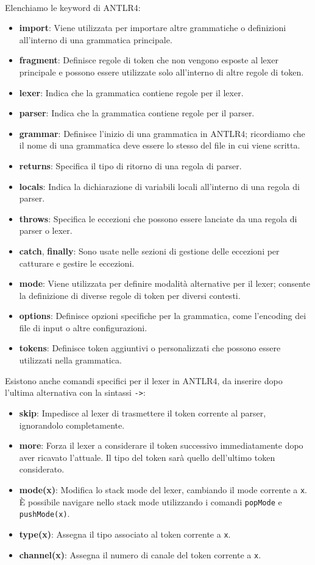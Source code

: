 \documentclass{article}
\begin{document}
\\
Elenchiamo le keyword di ANTLR4:
\begin{itemize}
    \item \textbf{import}: Viene utilizzata per importare altre grammatiche o definizioni all'interno di una grammatica principale.
    \item \textbf{fragment}: Definisce regole di token che non vengono esposte al lexer principale e possono essere utilizzate solo all'interno di altre regole di token.
    \item \textbf{lexer}: Indica che la grammatica contiene regole per il lexer.
    \item \textbf{parser}: Indica che la grammatica contiene regole per il parser.
    \item \textbf{grammar}: Definisce l'inizio di una grammatica in ANTLR4; ricordiamo che il nome di una grammatica deve essere lo stesso del file in cui viene scritta.
    \item \textbf{returns}: Specifica il tipo di ritorno di una regola di parser.
    \item \textbf{locals}: Indica la dichiarazione di variabili locali all'interno di una regola di parser.
    \item \textbf{throws}: Specifica le eccezioni che possono essere lanciate da una regola di parser o lexer.
    \item \textbf{catch}, \textbf{finally}: Sono usate nelle sezioni di gestione delle eccezioni per catturare e gestire le eccezioni.
    \item \textbf{mode}: Viene utilizzata per definire modalità alternative per il lexer; consente la definizione di diverse regole di token per diversi contesti.
    \item \textbf{options}: Definisce opzioni specifiche per la grammatica, come l'encoding dei file di input o altre configurazioni.
    \item \textbf{tokens}: Definisce token aggiuntivi o personalizzati che possono essere utilizzati nella grammatica.
\end{itemize}
Esistono anche comandi specifici per il lexer in ANTLR4, da inserire dopo l'ultima alternativa con la sintassi \texttt{->}:

\begin{itemize}
    \item \textbf{skip}: Impedisce al lexer di trasmettere il token corrente al parser, ignorandolo completamente.
    \item \textbf{more}: Forza il lexer a considerare il token successivo immediatamente dopo aver ricavato l'attuale. Il tipo del token sarà quello dell'ultimo token considerato.
    \item \textbf{mode(x)}: Modifica lo stack mode del lexer, cambiando il mode corrente a \texttt{x}. È possibile navigare nello stack mode utilizzando i comandi \texttt{popMode} e \texttt{pushMode(x)}.
    \item \textbf{type(x)}: Assegna il tipo associato al token corrente a \texttt{x}.
    \item \textbf{channel(x)}: Assegna il numero di canale del token corrente a \texttt{x}.
\end{itemize}
\end{document}

